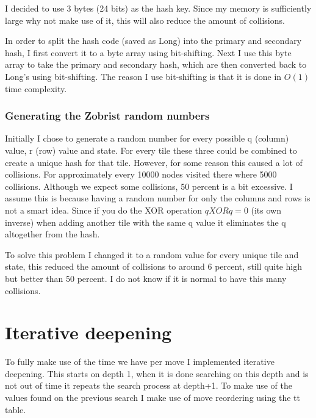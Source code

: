 \documentclass{article}
\begin{document}
I decided to use 3 bytes (24 bits) as the hash key. Since my memory is sufficiently large why not make use of it, this will also reduce the amount of collisions.

In order to split the hash code (saved as Long) into the primary and secondary hash, I first convert it to a byte array using bit-shifting. Next I use this byte array to take the primary and secondary hash, which are then converted back to Long's using bit-shifting. The reason I use bit-shifting is that it is done in $O(1)$ time complexity. 

\subsubsection{Generating the Zobrist random numbers}
Initially I chose to generate a random number for every possible q (column) value, r (row) value and state. For every tile these three could be combined to create a unique hash for that tile. However, for some reason this caused a lot of collisions. For approximately every 10000 nodes visited there where 5000 collisions. Although we expect some collisions, 50 percent is a bit excessive. I assume this is because having a random number for only the columns and rows is not a smart idea. Since if you do the XOR operation $q XOR q = 0$ (its own inverse) when adding another tile with the same q value it eliminates the q altogether from the hash.    

To solve this problem I changed it to a random value for every unique tile and state, this reduced the amount of collisions to around 6 percent, still quite high but better than 50 percent. I do not know if it is normal to have this many collisions.

\section{Iterative deepening}
To fully make use of the time we have per move I implemented iterative deepening. This starts on depth 1, when it is done searching on this depth and is not out of time it repeats the search process at depth+1. To make use of the values found on the previous search I make use of move reordering using the tt table.
\end{document}
